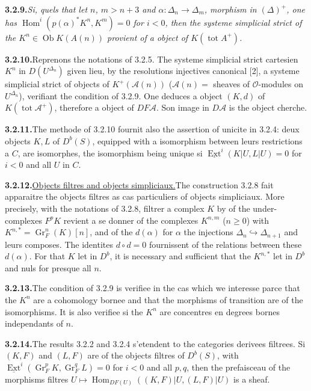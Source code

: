 \documentclass[12pt,a4paper]{article}
\theoremstyle{plain}
\theoremstyle{definition}
\DeclareMathOperator{\Hom}{Hom}
\DeclareMathOperator{\Ext}{Ext}
\DeclareMathOperator{\Gr}{Gr}
\DeclareMathOperator{\tot}{tot}
\DeclareMathOperator{\Ob}{Ob}
\begin{document}
\smallskip
\noindent\textbf{3.2.9.}\quad \emph{Si, quels that let $n$, $m > n+3$ and $\alpha : \Delta_n \to \Delta_m$, morphism in $(\Delta)^+$, one has $\Hom^i(p(\alpha)^* K^n, K^m) = 0$ for $i < 0$, then the systeme simplicial strict of the $K^n \in \Ob K(A(n))$ provient of a object of $K(\tot A^+)$.}

\smallskip
\noindent\textbf{3.2.10.}\quad Reprenons the notations of 3.2.5. The systeme simplicial strict cartesien $K^n$ in $D(U^{\Delta_n})$ given lieu, by the resolutions injectives canonical [2], a systeme simplicial strict of objects of $K^+(\mathcal{A}(n))$ ($\mathcal{A}(n) = $ sheaves of $\mathcal{O}$-modules on $U^{\Delta_n}$), verifiant the condition of 3.2.9. One deduces a object $(K, d)$ of $K(\tot \mathcal{A}^+)$, therefore a object of $DF\mathcal{A}$. Son image in $D\mathcal{A}$ is the object cherche.

\smallskip
\noindent\textbf{3.2.11.}\quad The methode of 3.2.10 fournit also the assertion of unicite in 3.2.4: deux objects $K, L$ of $D^b(S)$, equipped with a isomorphism between leurs restrictions a $C$, are isomorphes, the isomorphism being unique si $\underline{\Ext}^i(K|U, L|U) = 0$ for $i < 0$ and all $U$ in $C$.

\smallskip
\noindent\textbf{3.2.12.}\quad \underline{Objects filtres and objects simpliciaux.}\quad The construction 3.2.8 fait apparaitre the objects filtres as cas particuliers of objects simpliciaux. More precisely, with the notations of 3.2.8, filtrer a complex $K$ by of the under-complexes $F^p K$ revient a se donner of the complexes $K^{n,m}$ ($n \geqslant 0$) with $K^{n,*} = \Gr_F^n(K)[n]$, and of the $d(\alpha)$ for $\alpha$ the injections $\Delta_n \hookrightarrow \Delta_{n+1}$ and leurs composes. The identites $d \circ d = 0$ fournissent of the relations between these $d(\alpha)$. For that $K$ let in $D^b$, it is necessary and sufficient that the $K^{n,*}$ let in $D^b$ and nuls for presque all $n$.

\smallskip
\noindent\textbf{3.2.13.}\quad The condition of 3.2.9 is verifiee in the cas which we interesse parce that the $K^n$ are a cohomology bornee and that the morphisms of transition are of the isomorphisms. It is also verifiee si the $K^n$ are concentres en degrees bornes independants of $n$.

\smallskip
\noindent\textbf{3.2.14.}\quad The results 3.2.2 and 3.2.4 s'etendent to the categories derivees filtrees. Si $(K, F)$ and $(L, F)$ are of the objects filtres of $D^b(S)$, with $\underline{\Ext}^i(\Gr_F^p K, \Gr_F^q L) = 0$ for $i < 0$ and all $p, q$, then the prefaisceau of the morphisms filtres $U \mapsto \Hom_{DF(U)}((K, F)|U, (L, F)|U)$ is a sheaf.
\end{document}
